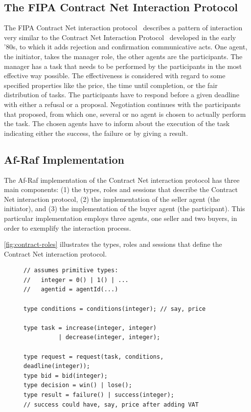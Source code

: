 \documentclass[a4paper,12pt,oneside,fleqn]{book} %
\begin{document}
{\subsection{The FIPA Contract Net Interaction Protocol} %
The FIPA Contract Net interaction protocol~\cite{web:fipa} describes a
pattern of interaction very similar to the Contract Net Interaction
Protocol~\cite{DBLP:journals/tc/Smith80a} developed in the early
'80s, to which it adds rejection and confirmation communicative acts. One
agent, the initiator, takes the manager role, the other agents are the
participants. The manager has a task that needs to be performed by the
participants in the most effective way possible. The effectiveness is
considered with regard to some specified properties like the price, the
time until completion, or the fair distribution of tasks. The participants
have to respond before a given deadline with either a refusal or a proposal.
Negotiation continues with the participants that proposed, from which one,
several or no agent is chosen to actually perform the task. The chosen
agents have to inform about the execution of the task indicating either the
success, the failure or by giving a result.
\subsection{Af-Raf Implementation} %
The Af-Raf implementation of the Contract Net interaction protocol has
three main components: (1) the types, roles and sessions that describe the
Contract Net interaction protocol, (2) the implementation of the seller
agent (the initiator), and (3) the implementation of the buyer agent (the
participant). This particular implementation employs three agents, one
seller and two buyers, in order to exemplify the interaction process.

\autoref{fig:contract-roles} illustrates the types, roles and sessions that
define the Contract Net interaction protocol.

\begin{figure}\footnotesize %
\begin{verbatim}
// assumes primitive types:
//   integer = 0() | 1() | ...
//   agentid = agentId(...)

type conditions = conditions(integer); // say, price

type task = increase(integer, integer)
          | decrease(integer, integer);

type request = request(task, conditions, deadline(integer));
type bid = bid(integer);
type decision = win() | lose();
type result = failure() | success(integer);
// success could have, say, price after adding VAT


\end{verbatim}
\end{figure}}
\end{document}
